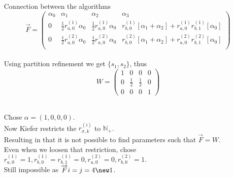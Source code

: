 \documentclass[rgb, pdf]{beamer}
\begin{document}
\begin{frame}[allowframebreaks]{Connection between the algorithms}
         \[ \overrightarrow{F} = \begin{pmatrix}
                                    \alpha_0 & \alpha_1 & \alpha_2 & \alpha_3 \\
                                    0 & \frac{1}{2} r^{(1)}_{a,0} \alpha_0 & \frac{1}{2} r^{(1)}_{a,0} \alpha_0 & r^{(1)}_{b,0} [\alpha_1 + \alpha_2] + r^{(1)}_{a,0} r^{(1)}_{b,1} [\alpha_0]   \\
                                    0 & \frac{1}{2} r^{(2)}_{a,0} \alpha_0 & \frac{1}{2} r^{(2)}_{a,0} \alpha_0 & r^{(2)}_{b,0} [\alpha_1 + \alpha_2] + r^{(2)}_{a,0} r^{(2)}_{b,1} [\alpha_0]   \\
                                \end{pmatrix}
        \] \\ \vspace{0.6cm}
        Using partition refinement we get $\{s_1, s_2\}$, thus \[ W = \begin{pmatrix}
                                    1 & 0 & 0 & 0 \\
                                    0 & \frac{1}{2} & \frac{1}{2} & 0 \\
                                    0 & 0 & 0 & 1
                                \end{pmatrix} \]\\
                                \framebreak
                                
        Chose $\alpha = (1,0,0,0)$. \\
        Now Kiefer restricts the $r^{(i)}_{\sigma,k}$ to $\mathbb{N_+}$. \\
        Resulting in that it is not possible to find parameters such that $\overrightarrow{F} = W$. \\
        Even when we loosen that restriction, chose $r^{(1)}_{a,0} = 1, r^{(1)}_{b,0} = r^{(1)}_{b,1} = 0, r^{(2)}_{a,0} = 0, r^{(2)}_{b,0} = 1$.\\
        Still impossible as $\overrightarrow{F}{i=j=4} \new 1$. \\
        \end{frame}
        
\end{document}
